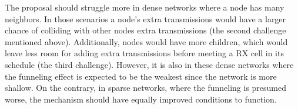 \documentclass[journal,comsoc]{IEEEtran}
\begin{document}


The proposal should struggle more in dense networks where a node has many neighbors. In those scenarios a node's extra transmissions would have a larger chance of colliding with other nodes extra transmissions (the second challenge mentioned above). Additionally, nodes would have more children, which would leave less room for adding extra transmissions before meeting a RX cell in its schedule (the third challenge). However, it is also in these dense networks where the funneling effect is expected to be the weakest since the network is more shallow. On the contrary, in sparse networks, where the funneling is presumed worse, the mechanism should have equally improved conditions to function.





%
%

\end{document}

